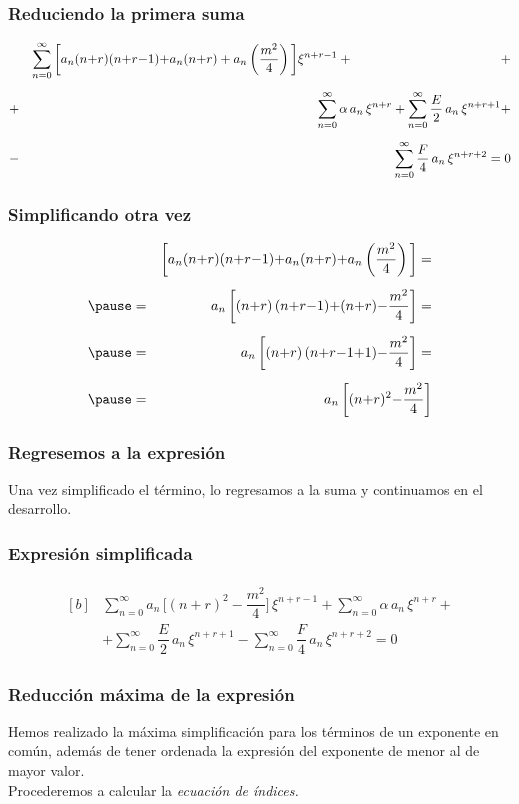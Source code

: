 \documentclass[12pt]{beamer}
\begin{document}
\begin{frame}
\frametitle{Reduciendo la primera suma}
\vspace{-1cm}
\begin{eqnarray*}
&{}& \sum_{n=0}^{\infty} \bigg[ a_{n} (n {+} r) (n {+} r {-} 1) {+} a_{n} (n {+} r) + a_{n} \left( \dfrac{m^{2}}{4} \right) \bigg] \xi^{n+r-1} + \hspace*{4cm} + \\[0.5em] 
&+& \sum_{n=0}^{\infty} \alpha \, a_{n} \, \xi^{n+r} + \sum_{n=0}^{\infty} \dfrac{E}{2} \, a_{n} \, \xi^{n+r+1} + \\[0.5em] 
&-& \sum_{n=0}^{\infty} \dfrac{F}{4} \, a_{n} \, \xi^{n+r+2} = 0
\end{eqnarray*}
\end{frame}
\begin{frame}
\frametitle{Simplificando otra vez}
\vspace{-1cm}
\begin{eqnarray*}
&{}& \bigg[ a_{n} (n {+} r) (n {+} r {-} 1) {+} a_{n} (n {+} r) {+} a_{n} \left( \dfrac{m^{2}}{4} \right) \bigg] = \\[0.5em] \pause
&=& a_{n} \, \bigg[  (n {+} r) \, (n {+} r {-} 1) {+} (n {+} r) {-} \dfrac{m^{2}}{4} \bigg] = \\[0.5em] \pause
&=& a_{n} \, \bigg[  (n {+} r) \, (n {+} r {-} 1 {+} {1}) {-} \dfrac{m^{2}}{4} \bigg] = \\[0.5em] \pause
&=& a_{n} \, \bigg[ (n {+} r)^{2} {-} \dfrac{m^{2}}{4} \bigg]
\end{eqnarray*}
\end{frame}
\begin{frame}
\frametitle{Regresemos a la expresión}
Una vez simplificado el término, lo regresamos a la suma y continuamos en el desarrollo.
\end{frame}
\begin{frame}
\frametitle{Expresión simplificada}
\vspace{-1cm}
\begin{align}
\begin{aligned}[b]
&{} \sum_{n=0}^{\infty} a_{n} \, \bigg[ (n {+} r)^{2} {-} \dfrac{m^{2}}{4} \bigg] \, \xi^{n+r-1} + \sum_{n=0}^{\infty} \alpha \, a_{n} \, \xi^{n+r} + \\[1em] 
&+ \sum_{n=0}^{\infty} \dfrac{E}{2} \, a_{n} \, \xi^{n+r+1} - \sum_{n=0}^{\infty} \dfrac{F}{4} \, a_{n} \, \xi^{n+r+2} = 0 
\end{aligned}
\label{eq:ecuacion_reducida}
\end{align}
\end{frame}
\begin{frame}
\frametitle{Reducción máxima de la expresión}
Hemos realizado la máxima simplificación para los términos de un exponente en común, además de tener ordenada la expresión del exponente de menor al de mayor valor.
\\
\bigskip
\pause
Procederemos a calcular la \emph{ecuación de índices.}
\end{frame}
\end{document}
